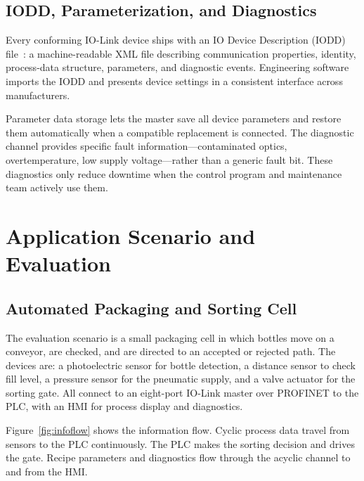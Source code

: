 \documentclass[conference]{IEEEtran}
\begin{document}
\subsection{IODD, Parameterization, and Diagnostics}

Every conforming IO-Link device ships with an IO Device Description
(IODD) file~\cite{iol_iodd}: a machine-readable XML file describing
communication properties, identity, process-data structure, parameters,
and diagnostic events. Engineering software imports the IODD and
presents device settings in a consistent interface across manufacturers.

Parameter data storage lets the master save all device parameters and
restore them automatically when a compatible replacement is connected.
The diagnostic channel provides specific fault information---contaminated
optics, overtemperature, low supply voltage---rather than a generic
fault bit. These diagnostics only reduce downtime when the control
program and maintenance team actively use them.

\section{Application Scenario and Evaluation}
\label{sec:scenario}

\subsection{Automated Packaging and Sorting Cell}

The evaluation scenario is a small packaging cell in which bottles move
on a conveyor, are checked, and are directed to an accepted or rejected
path. The devices are: a photoelectric sensor for bottle detection, a
distance sensor to check fill level, a pressure sensor for the
pneumatic supply, and a valve actuator for the sorting gate. All
connect to an eight-port IO-Link master over PROFINET to the PLC, with
an HMI for process display and diagnostics.

Figure~\ref{fig:infoflow} shows the information flow. Cyclic process
data travel from sensors to the PLC continuously. The PLC makes the
sorting decision and drives the gate. Recipe parameters and diagnostics
flow through the acyclic channel to and from the HMI.
\end{document}

